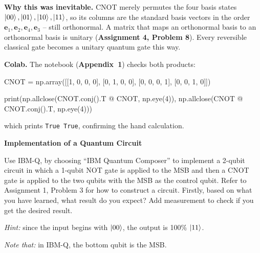 \documentclass[a4paper, 10pt]{article}
\begin{document}
\begin{solution}
	\noindent \textbf{Why this was inevitable.} CNOT merely permutes the four basis states \( \ket{00}, \ket{01}, \ket{10}, \ket{11} \), so its columns are the standard basis vectors in the order \( \mathbf{e}_1, \mathbf{e}_2, \mathbf{e}_4, \mathbf{e}_3 \) -- still orthonormal.
	A matrix that maps an orthonormal basis to an orthonormal basis is unitary (\textbf{Assignment 4, Problem 8}).
	Every reversible classical gate becomes a unitary quantum gate this way.

	\noindent \textbf{Colab.} The notebook (\textbf{Appendix~1}) checks both products:
	\begin{codingbox*}
CNOT = np.array([[1, 0, 0, 0],
                 [0, 1, 0, 0],
                 [0, 0, 0, 1],
                 [0, 0, 1, 0]])

print(np.allclose(CNOT.conj().T @ CNOT, np.eye(4)),
      np.allclose(CNOT @ CNOT.conj().T, np.eye(4)))
\end{codingbox*}
	\noindent which prints \texttt{True True}, confirming the hand calculation.
\end{solution}

\newpage

\begin{problem}
\textbf{Implementation of a Quantum Circuit}
\par Use IBM-Q, by choosing ``IBM Quantum Composer'' to implement a 2-qubit circuit in which a 1-qubit NOT gate is applied
to the MSB and then a CNOT gate is applied to the two qubits with the MSB as the control qubit.
Refer to Assignment 1, Problem 3 for how to construct a circuit.
Firstly, based on what you have learned, what result do you expect?
Add measurement to check if you get the desired result.
\par \textit{Hint:} since the input begins with \( \ket{00} \), the output is 100\% \( \ket{11} \).
\par \textit{Note that:} in IBM-Q, the bottom qubit is the MSB.
\end{problem}
\end{document}

